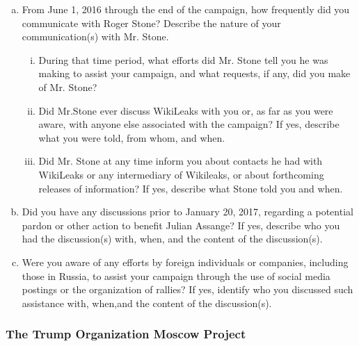 \begin{enumerate}[a.]
\item From June 1, 2016 through the end of the campaign, how frequently did you communicate with Roger Stone? Describe the nature of your communication(s) with Mr. Stone.

\begin{enumerate}[i.]

\item During that time period, what efforts did Mr. Stone tell you he was making to assist your campaign, and what requests, if any, did you make of Mr. Stone?

\item Did Mr.Stone ever discuss WikiLeaks with you or, as far as you were aware, with anyone else associated with the campaign?
If yes, describe what you were told, from whom, and when.

\item Did Mr. Stone at any time inform you about contacts he had with WikiLeaks or any intermediary of Wikileaks, or about forthcoming releases of information?
If yes, describe what Stone told you and when.

\end{enumerate}

\item Did you have any discussions prior to January 20, 2017, regarding a potential pardon or other action to benefit Julian Assange?
If yes, describe who you had the discussion(s) with, when, and the content of the discussion(s).

\item Were you aware of any efforts by foreign individuals or companies, including those in Russia, to assist your campaign through the use of social media postings or the organization of rallies?
If yes, identify who you discussed such assistance with, when,and the content of the discussion(s).

\end{enumerate}

\subsubsection{The Trump Organization Moscow Project}

